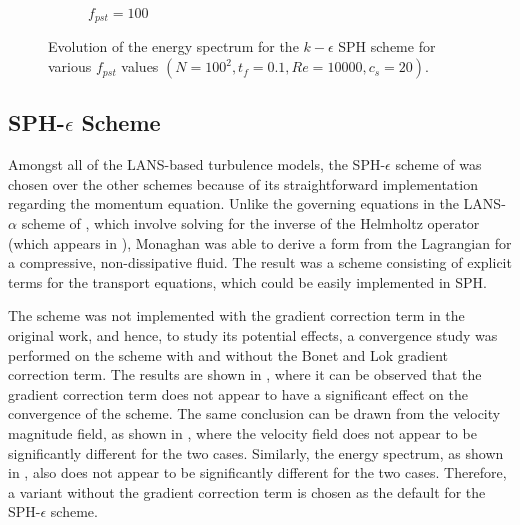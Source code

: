\begin{figure}[htbp!]
\begin{subfigure}{7cm}
    \caption{$f_{pst} = 100$}
  \end{subfigure}
  \caption{Evolution of the energy spectrum for the $k-\epsilon$ SPH scheme for various $f_{pst}$ values $(N=100^2, t_f=0.1, Re=10000, c_s=20)$.}
  \label{fig:keps-pst-espec}
\end{figure}



\subsection[SPH-epsilon Scheme]{SPH-$\epsilon$ Scheme}
Amongst all of the LANS-based turbulence models, the SPH-$\epsilon$ scheme of \cite{Monaghan2017} was chosen over the other schemes because of its straightforward implementation regarding the momentum equation. Unlike the governing equations in the LANS-$\alpha$ scheme of \cite{Mohseni2003}, which involve solving for the inverse of the Helmholtz operator (which appears in ), Monaghan was able to derive a form from the Lagrangian for a compressive, non-dissipative fluid. The result was a scheme consisting of explicit terms for the transport equations, which could be easily implemented in SPH.

The scheme was not implemented with the gradient correction term in the original work, and hence, to study its potential effects, a convergence study was performed on the scheme with and without the Bonet and Lok gradient correction term.
The results are shown in , where it can be observed that the gradient correction term does not appear to have a significant effect on the convergence of the scheme.
The same conclusion can be drawn from the velocity magnitude field, as shown in , where the velocity field does not appear to be significantly different for the two cases.
Similarly, the energy spectrum, as shown in , also does not appear to be significantly different for the two cases. Therefore, a variant without the gradient correction term is chosen as the default for the SPH-$\epsilon$ scheme.

